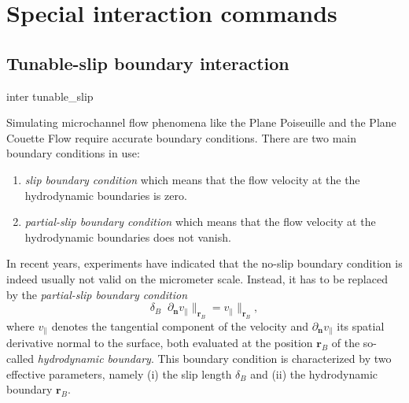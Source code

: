 \section{Special interaction commands}
\label{sec:inter-other}

\subsection{Tunable-slip boundary interaction}\label{sec:tunableSlip}
\begin{essyntax}
  inter  
  tunable_slip    
    
  \begin{features}
  \end{features}
\end{essyntax}
Simulating microchannel flow phenomena like the Plane Poiseuille and
the Plane Couette Flow require accurate boundary conditions. There are
two main boundary conditions in use:

\begin{enumerate} 
\item \emph{slip boundary condition} which means that the flow
  velocity at the the hydrodynamic boundaries is zero.
\item \emph{partial-slip boundary condition} which means that the flow 
  velocity at the hydrodynamic boundaries does not vanish.
\end{enumerate}

In recent years, experiments have indicated that the no-slip boundary
condition is indeed usually not valid on the micrometer
scale. Instead, it has to be replaced by the \emph{partial-slip
  boundary condition}
\begin{displaymath}
\delta_B \; \; \partial_\mathbf{n} v_{\parallel} \rVert_{\mathbf{r}_B} =
v_{\parallel} \rVert_{\mathbf{r}_B},
\end{displaymath}
where $v_{\parallel}$ denotes the tangential component of the velocity
and $\partial_\mathbf{n} v_{\parallel}$ its spatial derivative normal
to the surface, both evaluated at the position $\mathbf{r}_B$ of the
so-called \emph{hydrodynamic boundary}.  This boundary condition is
characterized by two effective parameters, namely (i) the slip length
$\delta_B$ and (ii) the hydrodynamic boundary $\mathbf{r}_B$.

